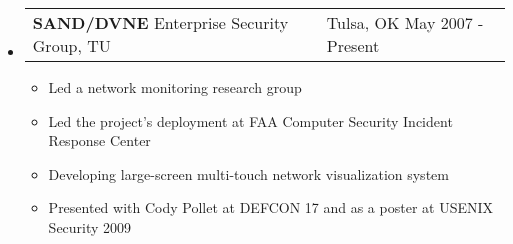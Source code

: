 \documentclass[letterpaper,11pt]{article}
\makeatletter
\newcommand{\resitem}[1]{\item \parbox[t]{4.6in}{#1} \vspace{-2pt}}
\newcommand{\resentry}[3][0pt]{
    \begin{tabular*}{0.9\textwidth}[t]{@{\hspace{#1}}p{5.0in-#1}@{\extracolsep{\fill}}p{0.75in}}
        #2 & #3
        \tabularnewline
    \end{tabular*} %
}
\newcommand{\ressubheading}[4]{
    \resentry{\textbf{#1} \newline #3}{#2 \newline #4}    
}
\makeatother
\begin{document}
\begin{itemize}
\item
	\ressubheading{SAND/DVNE}{Tulsa, OK}{Enterprise Security Group, TU}{May 2007 - Present}
	\begin{itemize}
		\resitem{Led a network monitoring research group}
		\resitem{Led the project's deployment at FAA Computer Security Incident Response Center}
		\resitem{Developing large-screen multi-touch network visualization system}
		\resitem{Presented with Cody Pollet at DEFCON 17 and as a poster at USENIX Security 2009}
	\end{itemize}
\end{itemize}
\end{document}
